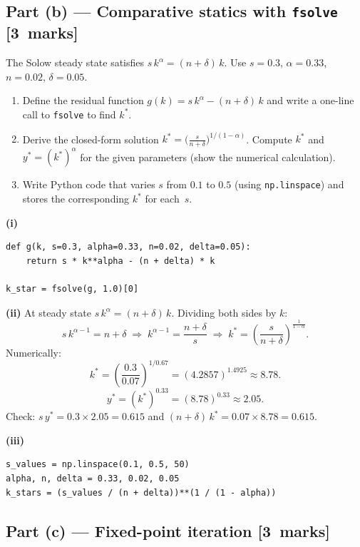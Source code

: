 \documentclass[11pt,a4paper]{article}
\newcommand{\mkpts}[1]{\hfill\textbf{[#1~marks]}}
\begin{document}
\subsection*{Part (b) --- Comparative statics with \texttt{fsolve} \mkpts{3}}

The Solow steady state satisfies $s\,k^{\alpha} = (n+\delta)\,k$.  Use $s=0.3$, $\alpha=0.33$, $n=0.02$, $\delta=0.05$.

\begin{enumerate}[label=(\roman*),nosep]
\item Define the residual function $g(k) = s\,k^{\alpha} - (n+\delta)\,k$ and write a one-line call to \texttt{fsolve} to find $k^*$.
\item Derive the closed-form solution $k^* = \bigl(\tfrac{s}{n+\delta}\bigr)^{1/(1-\alpha)}$. Compute $k^*$ and $y^* = (k^*)^{\alpha}$ for the given parameters (show the numerical calculation).
\item Write Python code that varies $s$ from $0.1$ to $0.5$ (using \texttt{np.linspace}) and stores the corresponding $k^*$ for each~$s$.
\end{enumerate}

\begin{solution}
\textbf{(i)}
\begin{lstlisting}[numbers=none]
def g(k, s=0.3, alpha=0.33, n=0.02, delta=0.05):
    return s * k**alpha - (n + delta) * k

k_star = fsolve(g, 1.0)[0]
\end{lstlisting}

\textbf{(ii)} At steady state $s\,k^{\alpha} = (n+\delta)\,k$.  Dividing both sides by $k$:
\[
s\,k^{\alpha-1} = n+\delta \;\Longrightarrow\; k^{\alpha-1} = \frac{n+\delta}{s} \;\Longrightarrow\; k^* = \left(\frac{s}{n+\delta}\right)^{\!\frac{1}{1-\alpha}}.
\]
Numerically:
\[
k^* = \left(\frac{0.3}{0.07}\right)^{1/0.67} = (4.2857)^{1.4925} \approx 8.78.
\]
\[
y^* = (k^*)^{0.33} = (8.78)^{0.33} \approx 2.05.
\]
Check: $s\,y^* = 0.3 \times 2.05 = 0.615$ and $(n+\delta)\,k^* = 0.07 \times 8.78 = 0.615$. \checkmark

\medskip

\textbf{(iii)}
\begin{lstlisting}[numbers=none]
s_values = np.linspace(0.1, 0.5, 50)
alpha, n, delta = 0.33, 0.02, 0.05
k_stars = (s_values / (n + delta))**(1 / (1 - alpha))
\end{lstlisting}
\end{solution}

\subsection*{Part (c) --- Fixed-point iteration \mkpts{3}}
\end{document}
